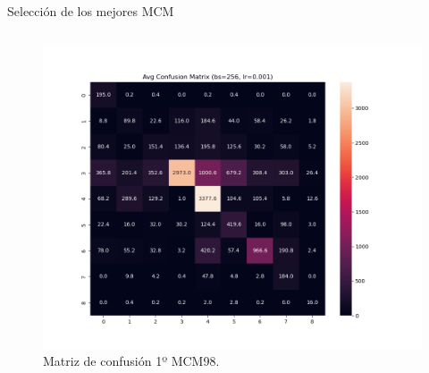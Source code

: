 \begin{frame}{Selección de los mejores MCM}
\begin{columns}[b]
\begin{column}{0.55\textwidth}
\begin{figure}[H]
    \centering
    \includegraphics[width=1\textwidth]{../Memoria/img/modelo/matrices_confusion/MC_ENT_MCM98.png}
    \caption{Matriz de confusión 1º MCM98.}
    \label{fig:MC_ENT_MCM98}
\end{figure}

\end{column}
\end{columns}
\end{frame}


